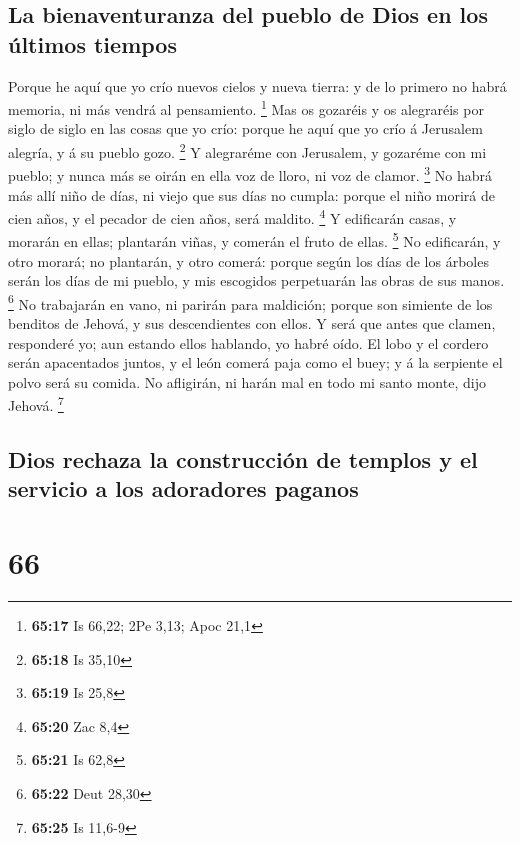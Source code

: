 \hypertarget{la-bienaventuranza-del-pueblo-de-dios-en-los-uxfaltimos-tiempos}{%
\subsection{La bienaventuranza del pueblo de Dios en los últimos
tiempos}\label{la-bienaventuranza-del-pueblo-de-dios-en-los-uxfaltimos-tiempos}}

 Porque he aquí que yo crío nuevos cielos y nueva tierra:
y de lo primero no habrá memoria, ni más vendrá al pensamiento.
\footnote{\textbf{65:17} Is 66,22; 2Pe 3,13; Apoc 21,1} 
Mas os gozaréis y os alegraréis por siglo de siglo en las cosas que yo
crío: porque he aquí que yo crío á Jerusalem alegría, y á su pueblo
gozo. \footnote{\textbf{65:18} Is 35,10}  Y alegraréme
con Jerusalem, y gozaréme con mi pueblo; y nunca más se oirán en ella
voz de lloro, ni voz de clamor. \footnote{\textbf{65:19} Is 25,8}
 No habrá más allí niño de días, ni viejo que sus días no
cumpla: porque el niño morirá de cien años, y el pecador de cien años,
será maldito. \footnote{\textbf{65:20} Zac 8,4}  Y
edificarán casas, y morarán en ellas; plantarán viñas, y comerán el
fruto de ellas. \footnote{\textbf{65:21} Is 62,8}  No
edificarán, y otro morará; no plantarán, y otro comerá: porque según los
días de los árboles serán los días de mi pueblo, y mis escogidos
perpetuarán las obras de sus manos. \footnote{\textbf{65:22} Deut 28,30}
 No trabajarán en vano, ni parirán para maldición; porque
son simiente de los benditos de Jehová, y sus descendientes con ellos.
 Y será que antes que clamen, responderé yo; aun estando
ellos hablando, yo habré oído.  El lobo y el cordero
serán apacentados juntos, y el león comerá paja como el buey; y á la
serpiente el polvo será su comida. No afligirán, ni harán mal en todo mi
santo monte, dijo Jehová. \footnote{\textbf{65:25} Is 11,6-9}

\hypertarget{dios-rechaza-la-construcciuxf3n-de-templos-y-el-servicio-a-los-adoradores-paganos}{%
\subsection{Dios rechaza la construcción de templos y el servicio a los
adoradores
paganos}\label{dios-rechaza-la-construcciuxf3n-de-templos-y-el-servicio-a-los-adoradores-paganos}}

\hypertarget{section-65}{%
\section{66}\label{section-65}}

